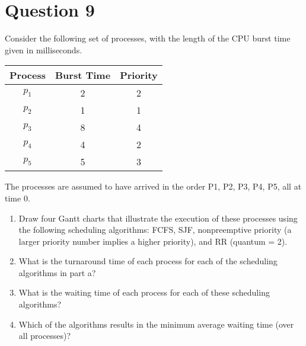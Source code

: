 \documentclass[a4paper,11pt]{article}
\begin{document}
\section{Question 9}
Consider the following set of processes, with the length of the CPU burst time given in milliseconds.
\begin{table}[h]
        \begin{center}
            \begin{tabular}{c|c|c}
                \textbf{Process} & \textbf{Burst Time} & \textbf{Priority}\\
                \hline
                $p_1$   &   2    &   2\\
                $p_2$   &   1    &   1\\
                $p_3$   &   8    &   4\\
                $p_4$   &   4    &   2\\
                $p_5$   &   5    &   3\\
            \end{tabular}
            \label{tab:table2}
        \end{center}
    \end{table}
The processes are assumed to have arrived in the order P1, P2, P3, P4, P5, all at time 0.

\begin{enumerate}[label=\alph*.]
    \item Draw four Gantt charts that illustrate the execution of these processes using the following scheduling algorithms: FCFS, SJF, nonpreemptive priority (a larger priority number implies a higher priority), and RR (quantum = 2).
    \item What is the turnaround time of each process for each of the scheduling algorithms in part a?
    \item What is the waiting time of each process for each of these scheduling algorithms?
    \item Which of the algorithms results in the minimum average waiting time (over all processes)?
\end{enumerate}

\pagebreak
\end{document}
